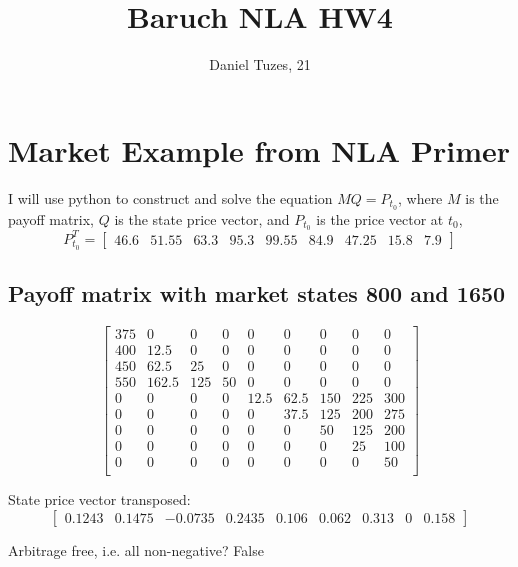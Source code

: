 \documentclass{article}
\title{Baruch NLA HW4}
\author{Daniel Tuzes, 21}
\begin{document}
\maketitle
\section{Market Example from NLA Primer}

I will use python to construct and solve the equation $MQ=P_{t_0}$,
where $M$ is the payoff matrix,
$Q$ is the state price vector,
and $P_{t_0}$ is the price vector at $t_0$,
\[
    P_{t_0}^T = \begin{bmatrix} 46.6 & 51.55 & 63.3 & 95.3 & 99.55 & 84.9 & 47.25 & 15.8 & 7.9 \end{bmatrix}
\]
\subsection{Payoff matrix with market states 800 and 1650}
\[
    \begin{bmatrix}
        375 & 0     & 0   & 0  & 0    & 0    & 0   & 0   & 0   \\
        400 & 12.5  & 0   & 0  & 0    & 0    & 0   & 0   & 0   \\
        450 & 62.5  & 25  & 0  & 0    & 0    & 0   & 0   & 0   \\
        550 & 162.5 & 125 & 50 & 0    & 0    & 0   & 0   & 0   \\
        0   & 0     & 0   & 0  & 12.5 & 62.5 & 150 & 225 & 300 \\
        0   & 0     & 0   & 0  & 0    & 37.5 & 125 & 200 & 275 \\
        0   & 0     & 0   & 0  & 0    & 0    & 50  & 125 & 200 \\
        0   & 0     & 0   & 0  & 0    & 0    & 0   & 25  & 100 \\
        0   & 0     & 0   & 0  & 0    & 0    & 0   & 0   & 50  \\
    \end{bmatrix}
\]

State price vector transposed: \[
    \begin{bmatrix} 0.1243 & 0.1475 & -0.0735 & 0.2435 & 0.106 & 0.062 & 0.313 & 0& 0.158 \end{bmatrix}
\]

Arbitrage free, i.e. all non-negative? False
\end{document}
